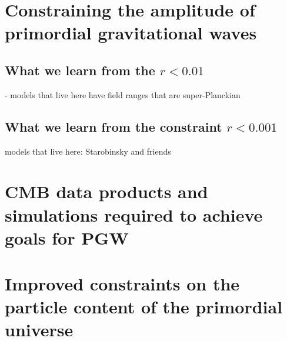 \section{Constraining the amplitude of primordial gravitational waves} 
\label{sec:upperLimits}
\subsection{What we learn from the $r<0.01$}
- models that live here have field ranges that are super-Planckian



\subsection{What we learn from the constraint $r<0.001$}

models that live here: Starobinsky and friends

\section{CMB data products and simulations required to achieve goals for PGW}
\label{sec:needs}

\section{Improved constraints on the particle content of the primordial universe}
\label{sec:scalar}

